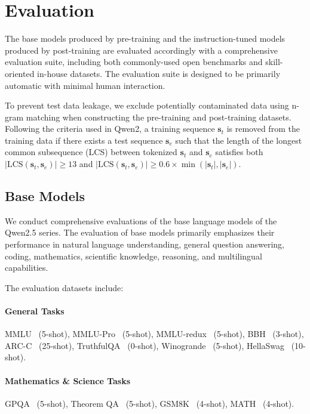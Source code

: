 



\section{Evaluation}
\label{sec:experiment}

The base models produced by pre-training and the instruction-tuned models produced by post-training are evaluated accordingly with a comprehensive evaluation suite, including both commonly-used open benchmarks and skill-oriented in-house datasets.
The evaluation suite is designed to be primarily automatic with minimal human interaction.

To prevent test data leakage, we exclude potentially contaminated data using n-gram matching when constructing the pre-training and post-training datasets. Following the criteria used in Qwen2, a training sequence $\mathbf{s}_t$ is removed from the training data if there exists a test sequence $\mathbf{s}_e$ such that the length of the longest common subsequence (LCS) between tokenized $\mathbf{s}_t$ and $\mathbf{s}_e$ satisfies both $|\text{LCS}(\mathbf{s}_t, \mathbf{s}_e)| \geq 13$ and $|\text{LCS}(\mathbf{s}_t, \mathbf{s}_e)| \geq 0.6 \times \min(|\mathbf{s}_t|, |\mathbf{s}_e|)$.

\subsection{Base Models}

We conduct comprehensive evaluations of the base language models of the Qwen2.5 series. 
The evaluation of base models primarily emphasizes their performance in natural language understanding, general question answering, coding, mathematics, scientific knowledge, reasoning, and multilingual capabilities.

The evaluation datasets include:

\paragraph{General Tasks} MMLU~\citep{mmlu} (5-shot), MMLU-Pro~\citep{mmlupro} (5-shot), MMLU-redux~\citep{mmluredux} (5-shot), BBH~\citep{bbh} (3-shot), ARC-C~\citep{arc} (25-shot), TruthfulQA~\citep{truthfulqa} (0-shot), Winogrande~\citep{winogrande} (5-shot), HellaSwag~\citep{hellaswag} (10-shot).

\paragraph{Mathematics \& Science Tasks} GPQA~\citep{gpqa} (5-shot), Theorem QA~\citep{theoremqa} (5-shot), GSM8K~\citep{gsm8k} (4-shot), MATH~\citep{math} (4-shot).

